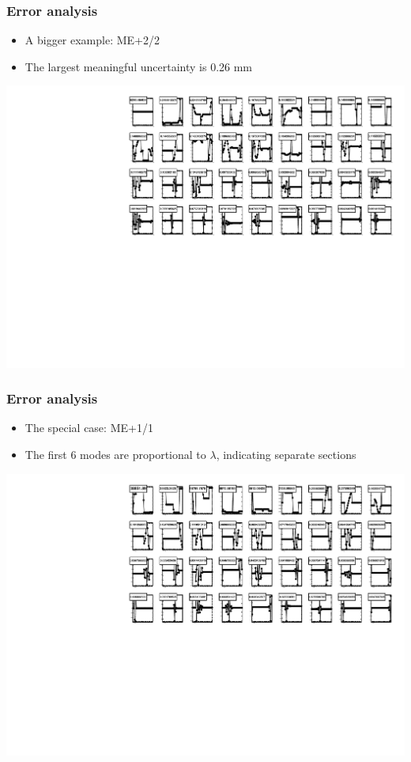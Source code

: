 \documentclass[compress]{beamer}
\begin{document}
\begin{frame}
\frametitle{Error analysis}

\begin{itemize}
\item A bigger example: ME+2/2
\item The largest meaningful uncertainty is 0.26 mm
\end{itemize}

\includegraphics[width=\linewidth]{errormodes_pgnormal_p22.pdf}
\end{frame}

\begin{frame}
\frametitle{Error analysis}

\begin{itemize}
\item The special case: ME+1/1
\item The first 6 modes are proportional to $\lambda$, indicating separate sections
\end{itemize}

\includegraphics[width=\linewidth]{errormodes_pgnormal_p11.pdf}
\end{frame}
\end{document}
